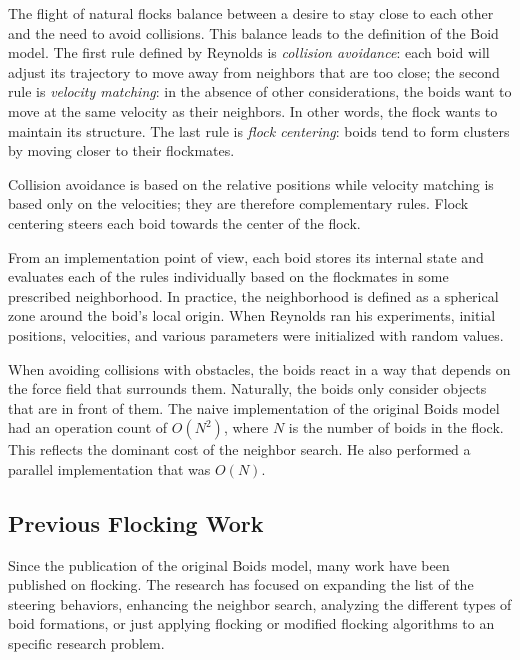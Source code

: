 The flight of natural flocks balance between a desire to stay close to each other and the need to avoid collisions. This balance leads to the definition of the Boid model. The first rule defined by Reynolds is \textit{collision avoidance}: each boid will adjust its trajectory to move away from neighbors that are too close;  the second rule is \textit{velocity matching}: in the absence of other considerations, the boids want to move at the same velocity as their neighbors. In other words, the flock wants to maintain its structure. The last rule is \textit{flock centering}: boids tend to form clusters by moving closer to their flockmates. 

Collision avoidance is based on the relative positions while velocity matching is based only on the velocities; they are therefore complementary rules. Flock centering steers each boid towards the center of the flock. 

From an implementation point of view, each boid stores its internal state and evaluates each of the rules individually based on the flockmates in some prescribed neighborhood. In practice, the neighborhood is defined as a spherical zone around the boid's local origin. When Reynolds ran his experiments, initial positions, velocities, and various parameters were initialized with random values. 

When avoiding collisions with obstacles, the boids react in a way that depends on the force field that surrounds them. Naturally, the boids only consider objects that are in front of them. The naive implementation of the original Boids model had an operation count of $O(N^2)$, where $N$ is the number of boids in the flock. This reflects the dominant cost of the neighbor search. He also performed a parallel implementation that was $O(N)$.

\subsection{Previous Flocking Work}\label{currentwork}
Since the publication of the original Boids model, many work have been published on flocking. The research has focused on expanding the list of the steering behaviors\cite{craigSteeringBehaviors}, enhancing the neighbor search\cite{spatialSwarms}, analyzing the different types of  boid formations\cite{lineFormations}, or just applying flocking or modified flocking algorithms to an specific research problem.

